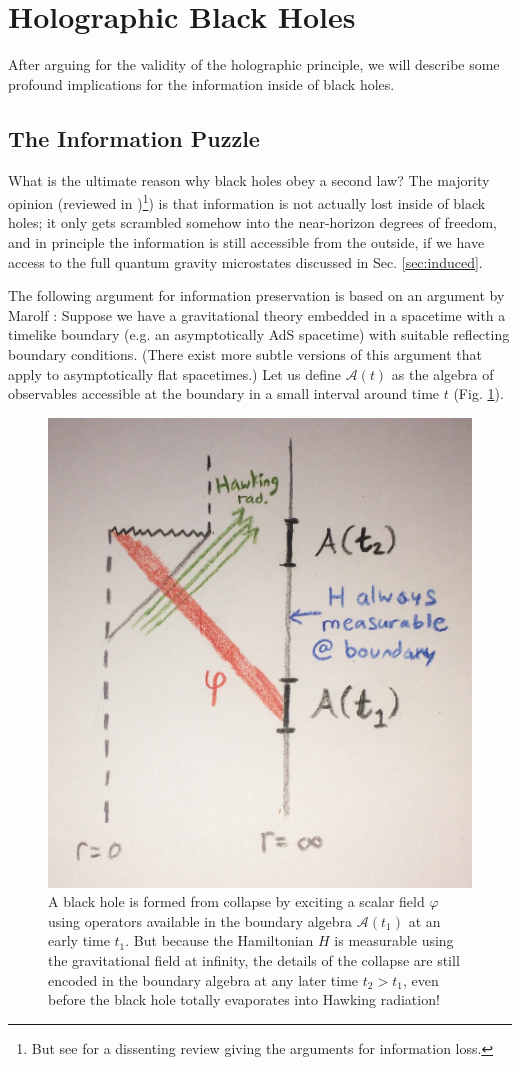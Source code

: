 \documentclass[12pt,a4paper]{article}
\begin{document}
\section{Holographic Black Holes} \label{sec:holographic}

After arguing for the validity of the holographic principle, we will describe some profound implications for the information inside of black holes.

\subsection{The Information Puzzle}

What is the ultimate reason why black holes obey a second law?  The majority opinion 
(reviewed in \cite{Polchinski:2016hrw})\footnote{But see \cite{Unruh:2017uaw} for a dissenting review giving the arguments for information loss.}) is that information is not actually lost inside of black holes; it only gets scrambled somehow into the near-horizon degrees of freedom, and in principle the information is still accessible from the outside, if we have access to the full quantum gravity microstates discussed in Sec. \ref{sec:induced}.

The following argument for information preservation is based on an argument by Marolf \cite{Marolf:2008mf,Marolf:2008mg}: Suppose we have a gravitational theory embedded in a spacetime with a timelike boundary (e.g. an asymptotically AdS spacetime) with suitable reflecting boundary conditions.  (There exist more subtle versions of this argument that apply to asymptotically flat spacetimes.)  Let us define $\mathcal{A}(t)$ as the algebra of observables accessible at the boundary in a small interval around time $t$ (Fig. \ref{fig:holo}).

\begin{figure}[ht]
\centering
\includegraphics[width=.4\textwidth]{holo.jpg}
\caption{\small A black hole is formed from collapse by exciting a scalar field $\varphi$ using operators available in the boundary algebra $\mathcal{A}(t_1)$ at an early time $t_1$.  But because the Hamiltonian $H$ is measurable using the gravitational field at infinity, the details of the collapse are still encoded in the boundary algebra at any later time $t_2 > t_1$, even before the black hole totally evaporates into Hawking radiation!}\label{fig:holo}
\end{figure}
\end{document}
